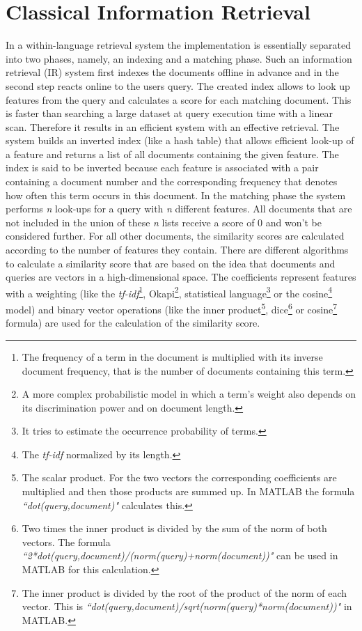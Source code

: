 \documentclass[journal]{IEEEtran}
\begin{document}
\section{Classical Information Retrieval}
In a within-language retrieval system the implementation is essentially separated into two phases, namely, an indexing and a matching phase.
Such an information retrieval (IR) system first indexes the documents offline in advance and in the second step reacts online to the users query.
The created index allows to look up features from the query and calculates a score for each matching document.
This is faster than searching a large dataset at query execution time with a linear scan.
Therefore it results in an efficient system with an effective retrieval.
The system builds an inverted index (like a hash table) that allows efficient look-up of a feature and returns a list of all documents containing the given feature.
The index is said to be inverted because each feature is associated with a pair containing a document number and the corresponding frequency that denotes how often this term occurs in this document.
In the matching phase the system performs \textit{n} look-ups for a query with \textit{n} different features.
All documents that are not included in the union of these \textit{n} lists receive a score of 0 and won't be considered further.
For all other documents, the similarity scores are calculated according to the number of features they contain.
There are different algorithms to calculate a similarity score that are based on the idea that documents and queries are vectors in a high-dimensional space.
The coefficients represent features with a weighting (like the \textit{tf-idf}\footnote{The frequency of a term in the document is multiplied with its inverse document frequency, that is the number of documents containing this term.}, Okapi\footnote{A more complex probabilistic model in which a term's weight also depends on its discrimination power and on document length.}, statistical language\footnote{It tries to estimate the occurrence probability of terms.} or the cosine\footnote{The \textit{tf-idf} normalized by its length.} model) and binary vector operations (like the inner product\footnote{The scalar product. For the two vectors the corresponding coefficients are multiplied and then those products are summed up. In MATLAB the formula \textit{``dot(query,document)"} calculates this.}, dice\footnote{Two times the inner product is divided by the sum of the norm of both vectors. The formula \textit{``2*dot(query,document)/(norm(query)+norm(document))"} can be used in MATLAB for this calculation.} or cosine\footnote{The inner product is divided by the root of the product of the norm of each vector. This is \textit{``dot(query,document)/sqrt(norm(query)*norm(document))"} in MATLAB.} formula) are used for the calculation of the similarity score.
\end{document}
